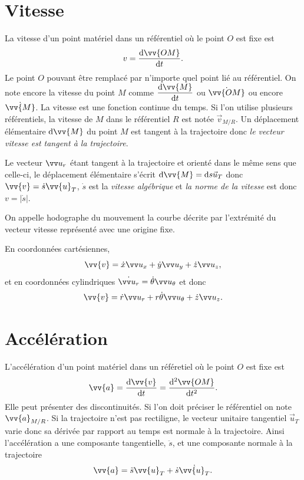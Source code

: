 \section{Vitesse}
\label{chap1-sec:vitesse}

La vitesse d'un point matériel dans un référentiel où le point $O$ est fixe est
\begin{equation}
  v = \derived{\vv{OM}}{t}.
\end{equation}
Le point $O$ pouvant être remplacé par n'importe quel point lié au référentiel. On note encore la vitesse du point $M$ comme $\derived{\vv{M}}{t}$ ou $\dot{\vv{OM}}$ ou encore $\dot{\vv{M}}$. La vitesse est une fonction continue du temps. Si l'on utilise plusieurs référentiels, la vitesse de $M$ dans le référentiel $R$ est notée $\vec{v}_{M/R}$. Un déplacement élémentaire $\D \vv{M}$ du point $M$ est tangent à la trajectoire donc \emph{le vecteur vitesse est tangent à la trajectoire}.

Le vecteur $\ur$ étant tangent à la trajectoire et orienté dans le même sens que celle-ci, le déplacement élémentaire s'écrit $\D \vv{M}=\D s \vec{u}_T$ donc $\vv{v}=\dot{s} \vv{u}_T$, $\dot{s}$ est la \emph{vitesse algébrique} et \emph{la norme de la vitesse} est donc $v=|\dot{s}|$.

On appelle hodographe du mouvement la courbe décrite par l'extrémité du vecteur vitesse représenté avec une origine fixe.

En coordonnées cartésiennes,
\begin{equation}
  \vv{v} = \dot{x}\ux+\dot{y}\uy+\dot{z}\uz,
\end{equation}
et en coordonnées cylindriques $\dot{\ur}=\dot{\theta}\utheta$ et donc
\begin{equation}
  \vv{v}=\dot{r}\ur+r\dot{\theta}\utheta+\dot{z}\uz.
\end{equation}

\section{Accélération}
\label{chap1-sec:accélération}

L'accélération d'un point matériel dans un référetiel où le point $O$ est fixe est
\begin{equation}
  \vv{a}=\derived{\vv{v}}{t}=\deriveds{\vv{OM}}{t}.
\end{equation}
Elle peut présenter des discontinuités. Si l'on doit préciser le référentiel on note $\vv{a}_{M/R}$. Si la trajectoire n'est pas rectiligne, le vecteur unitaire tangentiel $\vec{u}_T$ varie donc sa dérivée par rapport au temps est normale à la trajectoire. Ainsi l'accélération a une composante tangentielle, $\ddot{s}$, et une composante normale à la trajectoire
\begin{equation}
  \vv{a}=\ddot{s}\vv{u}_T + \dot{s}\dot{\vv{u}_T}.
\end{equation}

